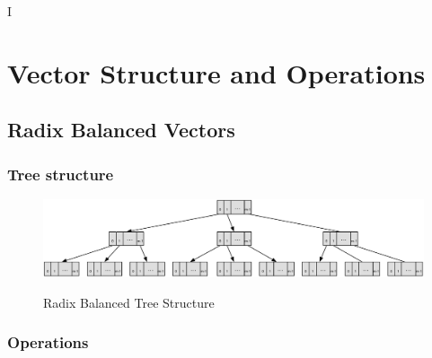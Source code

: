 I%

\chapter{Vector Structure and Operations} %

\label{VectorStructure} %



\section{Radix Balanced Vectors}


\subsection{Tree structure}


\begin{figure}[h!]
  \centering
  \includegraphics[width=\textwidth]{Figures/Radix_Balanced}
  \label{badix_balanced}
  \caption{Radix Balanced Tree Structure}
\end{figure}



\subsection{Operations}



